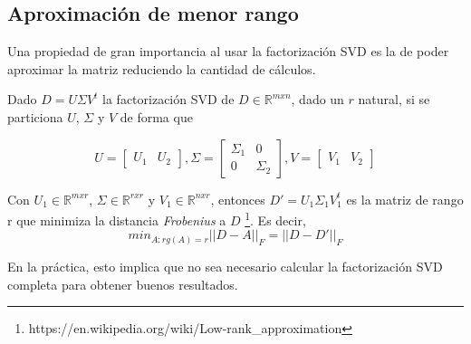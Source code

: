 \subsection{Aproximación de menor rango}
\label{sec:lowrank}
Una propiedad de gran importancia al usar la factorización SVD
es la de poder aproximar la matriz reduciendo la cantidad de cálculos.

Dado $D = U \Sigma V^{t}$ la factorización SVD de $D \in \mathbb{R}^{mxn}$,
dado un $r$ natural, si se particiona $U$, $\Sigma$ y $V$ de forma que

\begin{equation*}
    U = 
    \begin{bmatrix}
        U_1 & U_2
    \end{bmatrix},
    \Sigma = 
    \begin{bmatrix}
        \Sigma_1 & 0 \\
        0 & \Sigma_2
    \end{bmatrix},
    V = 
    \begin{bmatrix}
        V_1 & V_2
    \end{bmatrix}
\end{equation*}

Con $U_1 \in \mathbb{R}^{mxr}$, $\Sigma \in \mathbb{R}^{rxr}$ y $V_1 \in \mathbb{R}^{nxr}$,
entonces $D' = U_1 \Sigma_1 V^{t}_1$ es la matriz de rango r que minimiza la distancia \textit{Frobenius} a $D$
\footnote{https://en.wikipedia.org/wiki/Low-rank\_approximation}.
Es decir,
\begin{equation*}
    min_{A : rg(A) = r} ||D - A||_{F} = ||D - D'||_{F}
\end{equation*}

En la práctica, esto implica que no sea necesario calcular la factorización SVD
completa para obtener buenos resultados\cite{lowrank}.



